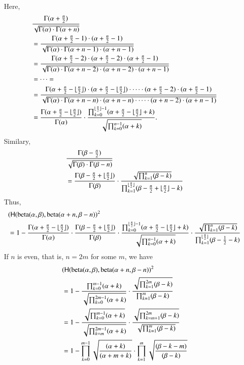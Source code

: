 \documentclass[runningheads,a4paper]{llncs}
\begin{document}
Here, 
\begin{align*}
\lefteqn{\frac{\Gamma(\alpha+\frac{n}{2})}{\sqrt{\Gamma(\alpha) \cdot \Gamma(\alpha + n )}}}\\
&= \frac{\Gamma(\alpha+\frac{n}{2} - 1) \cdot (\alpha+\frac{n}{2} - 1)}{\sqrt{\Gamma(\alpha) \cdot \Gamma(\alpha + n - 1 ) \cdot(\alpha + n - 1)}} \\
&= \frac{\Gamma(\alpha+\frac{n}{2} - 2) \cdot (\alpha+\frac{n}{2} - 2) \cdot (\alpha+\frac{n}{2} - 1)}{\sqrt{\Gamma(\alpha) \cdot \Gamma(\alpha + n - 2 ) \cdot(\alpha + n - 2) \cdot(\alpha + n - 1)}} \\
& = \cdots = \\
&= \frac{\Gamma(\alpha+\frac{n}{2} - \floor{\frac{n}{2}}) \cdot (\alpha+\frac{n}{2} - \floor{\frac{n}{2}}) \cdot \cdots \cdot (\alpha + \frac{n}{2} - 2 ) \cdot (\alpha+\frac{n}{2} - 1)}{\sqrt{\Gamma(\alpha) \cdot \Gamma(\alpha + n - n ) \cdot (\alpha + n - n) \cdot \cdots \cdot(\alpha + n - 2) \cdot(\alpha + n - 1)}} \\
&= \frac{\Gamma(\alpha+\frac{n}{2} - \floor{\frac{n}{2}})}{\Gamma(\alpha)}
\cdot \frac{\prod_{k = 0}^{\floor{\frac{n}{2}}-1}(\alpha + \frac{n}{2} - \floor{\frac{n}{2}}+ k)}{\sqrt{\prod_{k = 0}^{n-1}(\alpha + k) }}.
\end{align*}
Similary,
\begin{align*}
\lefteqn{\frac{\Gamma(\beta-\frac{n}{2})}{\sqrt{\Gamma(\beta) \cdot \Gamma(\beta - n)}}}\\
&=
\frac{\Gamma(\beta - \frac{n}{2} + \floor{\frac{n}{2}})}{\Gamma(\beta)}
\cdot \frac{\sqrt{\prod_{k = 1}^{n}(\beta - k)}}{\prod_{k = 1}^{\floor{\frac{n}{2}}}(\beta - \frac{n}{2} + \floor{\frac{n}{2}} -  k)}
\end{align*}
Thus,
\begin{align*}
\lefteqn{
( \hlg(\mathrm{beta}(\alpha,\beta),\mathrm{beta}(\alpha+n,\beta-n))^2
}\\
&=
1 - \frac{\Gamma(\alpha+\frac{n}{2} - \floor{\frac{n}{2}})}{\Gamma(\alpha)} \cdot
\frac{\Gamma(\beta - \frac{n}{2} + \floor{\frac{n}{2}})}{\Gamma(\beta)}
\cdot \frac{\prod_{k = 0}^{\floor{\frac{n}{2}}-1}(\alpha + \frac{n}{2} - \floor{\frac{n}{2}}+ k)}{\sqrt{\prod_{k = 0}^{n-1}(\alpha + k) }} 
\cdot \frac{\sqrt{\prod_{k = 1}^{n}(\beta - k)}}{\prod_{k = 1}^{\floor{\frac{n}{2}}}(\beta - \frac{1}{2} -  k)}
\end{align*}
If $n$ is even, that is, $n = 2m$ for some $m$, we have 
\begin{align*}
\lefteqn{
( \hlg(\mathrm{beta}(\alpha,\beta),\mathrm{beta}(\alpha+n,\beta-n))^2
}\\
&= 1 - \frac{\prod_{k = 0}^{m-1}(\alpha + k)}{\sqrt{\prod_{k = 0}^{2m -1}(\alpha + k) }} 
\cdot 
\frac{\sqrt{\prod_{k = 1}^{2m}(\beta - k)}}{\prod_{k = 1}^{m}(\beta -  k)}
\\
&= 1 - \frac{\sqrt{\prod_{k = 0}^{m-1}(\alpha + k)}}{\sqrt{\prod_{k = m}^{2m -1}(\alpha + k) }} 
\cdot 
\frac{\sqrt{\prod_{k = m+1}^{2m}(\beta - k)}}{\sqrt{\prod_{k = 1}^{m}(\beta -  k)}}
\\
&= 1 - \prod_{k = 0}^{m-1}
\sqrt{\frac{(\alpha + k)}{(\alpha + m + k)}}
\cdot
\prod_{k = 1}^{m} 
\sqrt{
\frac{(\beta - k - m)}{(\beta - k)}
}
\end{align*}
\end{document}
